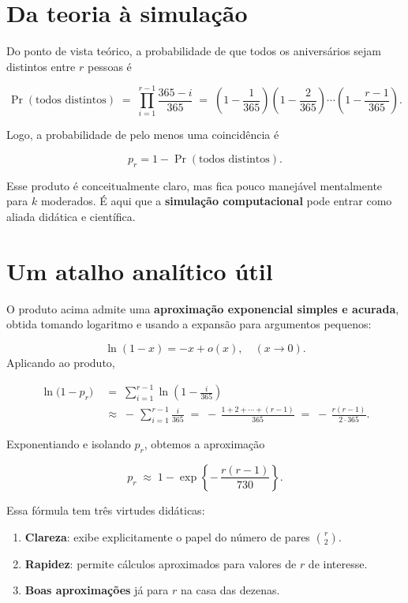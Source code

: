 \documentclass[
  letterpaper,
  DIV=11,
  numbers=noendperiod]{scrreprt}
\begin{document}
\section{Da teoria à simulação}\label{da-teoria-uxe0-simulauxe7uxe3o}

Do ponto de vista teórico, a probabilidade de que todos os aniversários
sejam distintos entre \(r\) pessoas é

\[\Pr(\text{todos distintos}) \;=\; \prod_{i=1}^{r-1} \frac{365-i}{365}
\;=\; \left(1 - \frac{1}{365}\right)\!\left(1 - \frac{2}{365}\right)\!\cdots\!\left(1 - \frac{r-1}{365}\right).\]

Logo, a probabilidade de pelo menos uma coincidência é

\[p_r = 1 - \Pr(\text{todos distintos}).\]

Esse produto é conceitualmente claro, mas fica pouco manejável
mentalmente para \(k\) moderados. É aqui que a \textbf{simulação
computacional} pode entrar como aliada didática e científica.

\section{Um atalho analítico útil}\label{um-atalho-analuxedtico-uxfatil}

O produto acima admite uma \textbf{aproximação exponencial simples e
acurada}, obtida tomando logaritmo e usando a expansão para argumentos
pequenos:

\[\ln(1 - x) = -x + o(x), \quad (x \to 0). \] Aplicando ao produto,

\[
\begin{aligned}
\ln\!\big(1 - p_r\big)
\;&=\;
\sum_{i=1}^{r-1} \ln\!\left(1 - \frac{i}{365}\right)\\
\;&\approx\;
-\,\sum_{i=1}^{r-1} \frac{i}{365}
\;=\;
-\,\frac{1 + 2 + \cdots + (r-1)}{365}
\;=\;
-\,\frac{r(r-1)}{2 \cdot 365}.\end{aligned}\]

Exponentiando e isolando \(p_r\), obtemos a aproximação

\[
p_r \;\approx\; 1 - \exp\!\left\{-\,\frac{r(r-1)}{730}\right\}.
\]

Essa fórmula tem três virtudes didáticas:

\begin{enumerate}
\def\labelenumi{\arabic{enumi})}
\item
  \textbf{Clareza}: exibe explicitamente o papel do número de pares
  \(\binom{r}{2}\).
\item
  \textbf{Rapidez}: permite cálculos aproximados para valores de \(r\)
  de interesse.
\item
  \textbf{Boas aproximações} já para \(r\) na casa das dezenas.
\end{enumerate}
\end{document}

